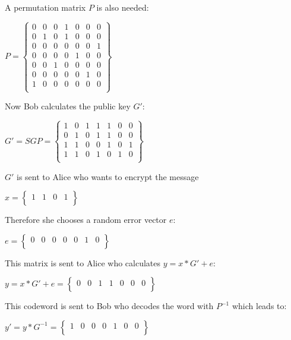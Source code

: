 A permutation matrix $P$ is also needed: 
\begin{center}
	$
	P =
	\begin{Bmatrix}
	0 & 0 & 0 & 1 & 0 & 0 & 0 \\
	0 & 1 & 0 & 1 & 0 & 0 & 0 \\
	0 & 0 & 0 & 0 & 0 & 0 & 1 \\
	0 & 0 & 0 & 0 & 1 & 0 & 0 \\
	0 & 0 & 1 & 0 & 0 & 0 & 0 \\
	0 & 0 & 0 & 0 & 0 & 1 & 0 \\
	1 & 0 & 0 & 0 & 0 & 0 & 0 \\
	
	\end{Bmatrix}
	$
\end{center}
Now Bob calculates the public key $G'$: 
\begin{center}
	$
	G' = SGP =
	\begin{Bmatrix}
	1 & 0 & 1 & 1 & 1 & 0 & 0 \\
	0 & 1 & 0 & 1 & 1 & 0 & 0 \\
	1 & 1 & 0 & 0 & 1 & 0 & 1 \\
	1 & 1 & 0 & 1 & 0 & 1 & 0 \\
	
	\end{Bmatrix}
	$
\end{center}
$G'$ is sent to Alice who wants to encrypt the message 	
\begin{center}
$
x =
\begin{Bmatrix}
1 & 1 & 0 & 1 \\
\end{Bmatrix}
$ 
\end{center}
Therefore she chooses a random error vector $e$:
\begin{center}
	$
	e =
	\begin{Bmatrix}
	0 & 0 & 0 & 0 & 0 & 1 & 0 \\
	\end{Bmatrix}
	$
\end{center}
This matrix is sent to Alice who calculates $y = x*G'+e$:
\begin{center}
	$
	y = x*G'+e =
	\begin{Bmatrix}
	0 & 0 & 1 & 1 & 0 & 0 & 0 \\
	\end{Bmatrix}
	$
\end{center}
This codeword is sent to Bob who decodes the word with $P^{-1}$ which leads to:
\begin{center}
	$
	y' = y*G^{-1} =
	\begin{Bmatrix}
	1 & 0 & 0 & 0 & 1 & 0 & 0 \\
	\end{Bmatrix}
	$
\end{center}
